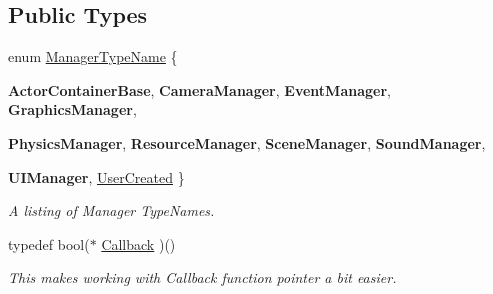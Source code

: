 \subsection*{Public Types}
\begin{DoxyCompactItemize}
\item 
enum \hyperlink{classphys_1_1ManagerBase_aaa6ccddf23892eaccb898529414f80a5}{ManagerTypeName} \{ \par
{\bfseries ActorContainerBase}, 
{\bfseries CameraManager}, 
{\bfseries EventManager}, 
{\bfseries GraphicsManager}, 
\par
{\bfseries PhysicsManager}, 
{\bfseries ResourceManager}, 
{\bfseries SceneManager}, 
{\bfseries SoundManager}, 
\par
{\bfseries UIManager}, 
\hyperlink{classphys_1_1ManagerBase_aaa6ccddf23892eaccb898529414f80a5a3239296e554feede76c4bcb6f824c66c}{UserCreated}
 \}
\begin{DoxyCompactList}\small\item\em A listing of Manager TypeNames. \item\end{DoxyCompactList}\item 
\hypertarget{classphys_1_1ManagerBase_a753f5f0127131529767beab2502f480b}{
typedef bool($\ast$ \hyperlink{classphys_1_1ManagerBase_a753f5f0127131529767beab2502f480b}{Callback} )()}
\label{d2/de3/classphys_1_1ManagerBase_a753f5f0127131529767beab2502f480b}

\begin{DoxyCompactList}\small\item\em This makes working with Callback function pointer a bit easier. \item\end{DoxyCompactList}\end{DoxyCompactItemize}
